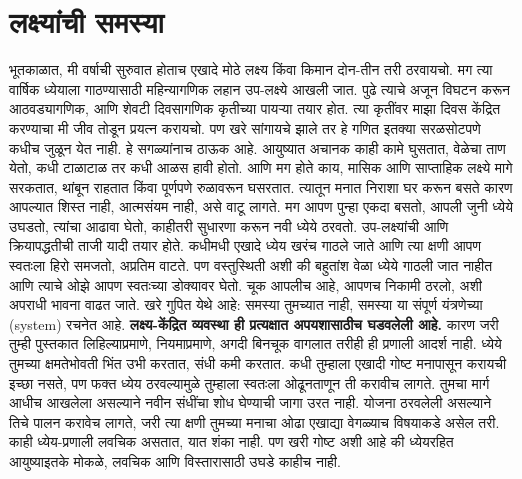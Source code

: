 \section*{लक्ष्यांची समस्या}
भूतकाळात, मी वर्षाची सुरुवात होताच एखादे मोठे लक्ष्य किंवा किमान दोन-तीन तरी ठरवायचो. मग त्या वार्षिक ध्येयाला गाठण्यासाठी महिन्यागणिक लहान उप-लक्ष्ये आखली जात. पुढे त्याचे अजून विघटन करून आठवड्यागणिक, आणि शेवटी दिवसागणिक कृतीच्या पायऱ्या तयार होत. त्या कृतींवर माझा दिवस केंद्रित करण्याचा मी जीव तोडून प्रयत्न करायचो.
पण खरे सांगायचे झाले तर हे गणित इतक्या सरळसोटपणे कधीच जुळून येत नाही. हे सगळ्यांनाच ठाऊक आहे. आयुष्यात अचानक काही कामे घुसतात, वेळेचा ताण येतो, कधी टाळाटाळ तर कधी आळस हावी होतो. आणि मग होते काय, मासिक आणि साप्ताहिक लक्ष्ये मागे सरकतात, थांबून राहतात किंवा पूर्णपणे रुळावरून घसरतात. त्यातून मनात निराशा घर करून बसते कारण आपल्यात शिस्त नाही, आत्मसंयम नाही, असे वाटू लागते. मग आपण पुन्हा एकदा बसतो, आपली जुनी ध्येये उघडतो, त्यांचा आढावा घेतो, काहीतरी सुधारणा करून नवी ध्येये ठरवतो. उप-लक्ष्यांची आणि क्रियापद्धतीची ताजी यादी तयार होते.
कधीमधी एखादे ध्येय खरंच गाठले जाते आणि त्या क्षणी आपण स्वतःला हिरो समजतो, अप्रतिम वाटते. पण वस्तुस्थिती अशी की बहुतांश वेळा ध्येये गाठली जात नाहीत आणि त्याचे ओझे आपण स्वतःच्या डोक्यावर घेतो. चूक आपलीच आहे, आपणच निकामी ठरलो, अशी अपराधी भावना वाढत जाते.
खरे गुपित येथे आहे: समस्या तुमच्यात नाही, समस्या या संपूर्ण यंत्रणेच्या (system) रचनेत आहे. \textbf{लक्ष्य-केंद्रित व्यवस्था ही प्रत्यक्षात अपयशासाठीच घडवलेली आहे.}
कारण जरी तुम्ही पुस्तकात लिहिल्याप्रमाणे, नियमाप्रमाणे, अगदी बिनचूक वागलात तरीही ही प्रणाली आदर्श नाही. ध्येये तुमच्या क्षमतेभोवती भिंत उभी करतात, संधी कमी करतात. कधी तुम्हाला एखादी गोष्ट मनापासून करायची इच्छा नसते, पण फक्त ध्येय ठरवल्यामुळे तुम्हाला स्वतःला ओढूनताणून ती करावीच लागते. तुमचा मार्ग आधीच आखलेला असल्याने नवीन संधींचा शोध घेण्याची जागा उरत नाही. योजना ठरवलेली असल्याने तिचे पालन करावेच लागते, जरी त्या क्षणी तुमच्या मनाचा ओढा एखाद्या वेगळ्याच विषयाकडे असेल तरी.
काही ध्येय-प्रणाली लवचिक असतात, यात शंका नाही. पण खरी गोष्ट अशी आहे की ध्येयरहित आयुष्याइतके मोकळे, लवचिक आणि विस्तारासाठी उघडे काहीच नाही.
